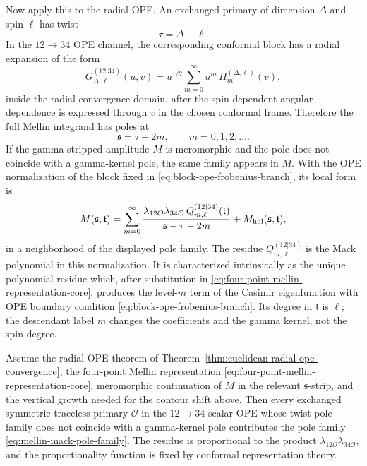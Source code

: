 Now apply this to the radial OPE.  An exchanged primary of dimension
\(\Delta\) and spin \(\ell\) has twist
\[
  \tau=\Delta-\ell .
\]
In the \(12\to34\) OPE channel, the corresponding conformal block has a
radial expansion of the form
\begin{equation}
  G_{\Delta,\ell}^{(12|34)}(u,v)
  =
  u^{\tau/2}
  \sum_{m=0}^{\infty}u^m\,H_m^{(\Delta,\ell)}(v),
  \label{eq:block-small-u-twist-expansion}
\end{equation}
inside the radial convergence domain, after the spin-dependent angular
dependence is expressed through \(v\) in the chosen conformal frame.  Therefore
the full Mellin integrand has poles at
\begin{equation}
  \mathfrak s=\tau+2m,\qquad m=0,1,2,\ldots .
  \label{eq:mellin-ope-twist-pole-family-core}
\end{equation}
If the gamma-stripped amplitude \(M\) is meromorphic and the pole does not
coincide with a gamma-kernel pole, the same family appears in \(M\).  With the
OPE normalization of the block fixed in
\eqref{eq:block-ope-frobenius-branch}, its local form is
\begin{equation}
  M(\mathfrak s,\mathfrak t)
  =
  \sum_{m=0}^{\infty}
  \frac{
    \lambda_{12\mathcal O}\lambda_{34\mathcal O}\,
    Q_{m,\ell}^{(12|34)}(\mathfrak t)
  }{\mathfrak s-\tau-2m}
  +
  M_{\rm hol}(\mathfrak s,\mathfrak t),
  \label{eq:mellin-mack-pole-family}
\end{equation}
in a neighborhood of the displayed pole family.  The residue
\(Q_{m,\ell}^{(12|34)}\) is the Mack polynomial in this normalization.  It is
characterized intrinsically as the unique polynomial residue which, after
substitution in \eqref{eq:four-point-mellin-representation-core}, produces
the level-\(m\) term of the Casimir eigenfunction with OPE boundary condition
\eqref{eq:block-ope-frobenius-branch}.  Its degree in \(\mathfrak t\) is
\(\ell\); the descendant label \(m\) changes the coefficients and the gamma
kernel, not the spin degree.

\begin{proposition}
\label{prop:mellin-ope-pole-family}
Assume the radial OPE theorem of
Theorem~\ref{thm:euclidean-radial-ope-convergence}, the four-point Mellin
representation \eqref{eq:four-point-mellin-representation-core}, meromorphic
continuation of \(M\) in the relevant \(\mathfrak s\)-strip, and the vertical
growth needed for the contour shift above.  Then every exchanged
symmetric-traceless primary \(\mathcal O\) in the \(12\to34\) scalar OPE whose
twist-pole family does not coincide with a gamma-kernel pole contributes the
pole family \eqref{eq:mellin-mack-pole-family}.  The residue is
proportional to the product
\(\lambda_{12\mathcal O}\lambda_{34\mathcal O}\), and the proportionality
function is fixed by conformal representation theory.
\end{proposition}

